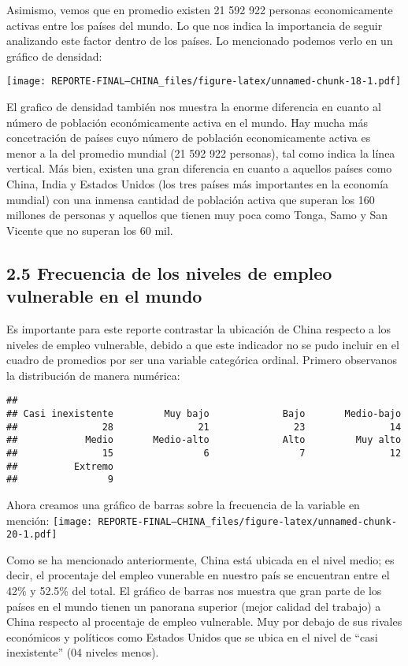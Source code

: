 \documentclass[
]{article}
\begin{document}
Asimismo, vemos que en promedio existen 21 592 922 personas
economicamente activas entre los países del mundo. Lo que nos indica la
importancia de seguir analizando este factor dentro de los países. Lo
mencionado podemos verlo en un gráfico de densidad:

\texttt{[image: REPORTE-FINAL--CHINA\_files/figure-latex/unnamed-chunk-18-1.pdf]}

El grafico de densidad también nos muestra la enorme diferencia en
cuanto al número de población económicamente activa en el mundo. Hay
mucha más concetración de países cuyo número de población economicamente
activa es menor a la del promedio mundial (21 592 922 personas), tal
como indica la línea vertical. Más bien, existen una gran diferencia en
cuanto a aquellos países como China, India y Estados Unidos (los tres
países más importantes en la economía mundial) con una inmensa cantidad
de población activa que superan los 160 millones de personas y aquellos
que tienen muy poca como Tonga, Samo y San Vicente que no superan los 60
mil.

\hypertarget{frecuencia-de-los-niveles-de-empleo-vulnerable-en-el-mundo}{%
\subsection{2.5 Frecuencia de los niveles de empleo vulnerable en el
mundo}\label{frecuencia-de-los-niveles-de-empleo-vulnerable-en-el-mundo}}

Es importante para este reporte contrastar la ubicación de China
respecto a los niveles de empleo vulnerable, debido a que este indicador
no se pudo incluir en el cuadro de promedios por ser una variable
categórica ordinal. Primero observanos la distribución de manera
numérica:

\begin{verbatim}
## 
## Casi inexistente         Muy bajo             Bajo       Medio-bajo 
##               28               21               23               14 
##            Medio       Medio-alto             Alto         Muy alto 
##               15                6                7               12 
##          Extremo 
##                9
\end{verbatim}

Ahora creamos una gráfico de barras sobre la frecuencia de la variable
en mención:
\texttt{[image: REPORTE-FINAL--CHINA\_files/figure-latex/unnamed-chunk-20-1.pdf]}

Como se ha mencionado anteriormente, China está ubicada en el nivel
medio; es decir, el procentaje del empleo vunerable en nuestro país se
encuentran entre el 42\% y 52.5\% del total. El gráfico de barras nos
muestra que gran parte de los países en el mundo tienen un panorana
superior (mejor calidad del trabajo) a China respecto al procentaje de
empleo vulnerable. Muy por debajo de sus rivales económicos y políticos
como Estados Unidos que se ubica en el nivel de ``casi inexistente'' (04
niveles menos).
\end{document}
